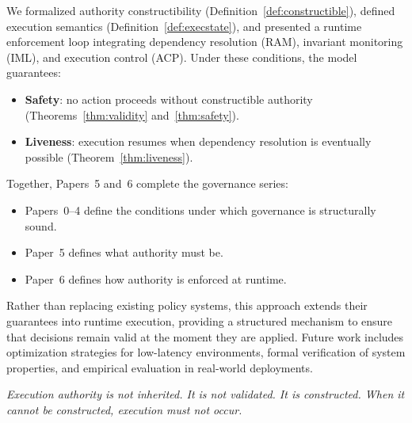 \documentclass[11pt]{article}
\begin{document}
We formalized authority constructibility (Definition~\ref{def:constructible}), defined
execution semantics (Definition~\ref{def:execstate}), and presented a runtime enforcement
loop integrating dependency resolution (RAM), invariant monitoring (IML), and execution
control (ACP). Under these conditions, the model guarantees:

\begin{itemize}
  \item \textbf{Safety}: no action proceeds without constructible authority
        (Theorems~\ref{thm:validity} and~\ref{thm:safety}).
  \item \textbf{Liveness}: execution resumes when dependency resolution is eventually
        possible (Theorem~\ref{thm:liveness}).
\end{itemize}

Together, Papers~5 and~6 complete the governance series:

\begin{itemize}
  \item Papers~0--4 define the conditions under which governance is structurally sound.
  \item Paper~5 defines what authority must be.
  \item Paper~6 defines how authority is enforced at runtime.
\end{itemize}

Rather than replacing existing policy systems, this approach extends their guarantees
into runtime execution, providing a structured mechanism to ensure that decisions remain
valid at the moment they are applied. Future work includes optimization strategies for
low-latency environments, formal verification of system properties, and empirical
evaluation in real-world deployments.

\medskip
\noindent\textit{Execution authority is not inherited. It is not validated. It is
constructed. When it cannot be constructed, execution must not occur.}


\newpage
\end{document}
